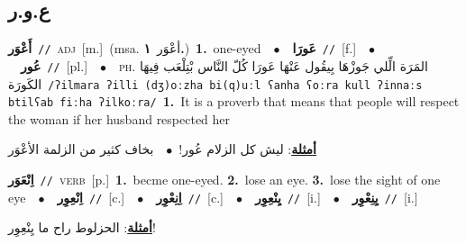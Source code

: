 \documentclass[10pt,a4paper,twoside]{article} %
\begin{document}
\begin{multicols}{2}
\vspace{-3mm}
\subsection*{\color{blue}\foreignlanguage{arabic}{ع.و.ر}\color{blue}{}} 

{\setlength\topsep{0pt}\textbf{\foreignlanguage{arabic}{أَعْوَر}}\ {\color{gray}\texttt{//}\color{black}}\ \textsc{adj}\ [m.]\ \color{gray}(msa. \foreignlanguage{arabic}{أعْوَر}~\foreignlanguage{arabic}{\textbf{١.}})\color{black}\ \textbf{1.}~one-eyed\ \ $\bullet$\ \ \setlength\topsep{0pt}\textbf{\foreignlanguage{arabic}{عَورَا}}\ {\color{gray}\texttt{//}\color{black}}\ [f.]\ \ $\bullet$\ \ \setlength\topsep{0pt}\textbf{\foreignlanguage{arabic}{عُور}}\ {\color{gray}\texttt{//}\color{black}}\ [pl.]\ \ $\bullet$\ \ \textsc{ph.} \color{gray} \foreignlanguage{arabic}{المَرَة الِّلي جَوزْهَا بِيقُول عَنْهَا عَورَا كُلّ النَّاس بْتِلْعَب فِيهَا الكَورَة}\color{black}\ {\color{gray}\texttt{/{\sffamily ʔilmara ʔilli (dʒ)oːzha bi(q)uːl ʕanha ʕoːra kull ʔinnaːs btilʕab fiːha ʔilkoːra}/}\color{black}}\ \textbf{1.}~It is a proverb that means that people will respect the woman if her husband respected her\  \begin{flushright}\color{gray}\foreignlanguage{arabic}{\textbf{\underline{\foreignlanguage{arabic}{أمثلة}}}: ليش كل الزلام عُور!\ $\bullet$\ \  بخاف كثير من الزلمة الأعْوَر}\end{flushright}\color{black}} \vspace{2mm}

{\setlength\topsep{0pt}\textbf{\foreignlanguage{arabic}{اِنْعَوَر}}\ {\color{gray}\texttt{//}\color{black}}\ \textsc{verb}\ [p.]\ \textbf{1.}~becme one-eyed.  \textbf{2.}~lose an eye.  \textbf{3.}~lose the sight of one eye\ \ $\bullet$\ \ \setlength\topsep{0pt}\textbf{\foreignlanguage{arabic}{اِنْعِوِر}}\ {\color{gray}\texttt{//}\color{black}}\ [c.]\ \ $\bullet$\ \ \setlength\topsep{0pt}\textbf{\foreignlanguage{arabic}{اِنِعْوِر}}\ {\color{gray}\texttt{//}\color{black}}\ [c.]\ \ $\bullet$\ \ \setlength\topsep{0pt}\textbf{\foreignlanguage{arabic}{يِنْعِوِر}}\ {\color{gray}\texttt{//}\color{black}}\ [i.]\ \ $\bullet$\ \ \setlength\topsep{0pt}\textbf{\foreignlanguage{arabic}{يِنِعْوِر}}\ {\color{gray}\texttt{//}\color{black}}\ [i.]\  \begin{flushright}\color{gray}\foreignlanguage{arabic}{\textbf{\underline{\foreignlanguage{arabic}{أمثلة}}}: الحزلوط راح ما يِنْعِوِر!}\end{flushright}\color{black}} \vspace{2mm}


\end{multicols}
\end{document}

